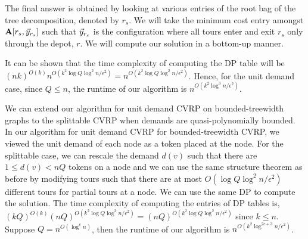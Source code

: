 \documentclass[twoside,leqno]{article}
\newcommand{\eps}{\epsilon}
\begin{document}
The final answer is obtained by looking at various entries of the root bag of the tree decomposition, denoted by $r_s$. We will take the minimum cost entry amongst $\textbf{A}[r_s, \vec{y}_{r_s}]$ such that $\vec{y}_{r_s}$ is the configuration where all tours enter and exit $r_s$ only through the depot, $r$. We will compute our solution in a bottom-up manner. 

It can be shown that the time complexity of computing the DP table will be
$(nk)^{O(k)}n^{O(k^2\log Q\log^2 n/\eps^2)} = n^{O(k^2\log Q\log^2 n/\eps^2)}$. Hence, for the unit demand case, since $Q \le n$, the runtime of our algorithm is $n^{O(k^2\log^3 n/\eps^2)}$.  

We can extend our algorithm for unit demand CVRP on bounded-treewidth graphs to the splittable CVRP when demands are quasi-polynomially bounded.  In our algorithm for unit demand CVRP for bounded-treewidth CVRP, we viewed the unit demand of each node as a token placed at the node. For the splittable case, we can rescale the demand $d(v)$ such that there are $1 \le d(v) < nQ$ tokens on a node and we can use the same structure theorem as before by modifying tours such that there are at most $O(\log Q \log^2 n/\eps^2)$ different tours for partial tours at a node. We can use the same DP to compute the solution. 
The time complexity of computing the entries of DP tables is, $(kQ)^{O(k)}(nQ)^{O(k^2\log Q\log^2 n/\eps^2)} = (nQ)^{O(k^2\log Q\log^2 n/\eps^2)}$ since $k \le n$. Suppose $Q = n^{O(\log^c n)}$, then the runtime of our algorithm is $n^{O(k^2 \log^{2c + 3}n/\eps^2)}$. 

\end{document}
